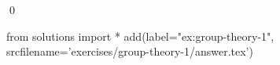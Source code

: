 
\begin{ex} 
  \label{ex:group-theory-1}
  
  \qed
\end{ex} 
\begin{python0}
from solutions import *
add(label="ex:group-theory-1",
    srcfilename='exercises/group-theory-1/answer.tex') 
\end{python0}
